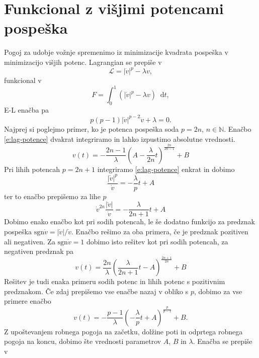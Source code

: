 \documentclass[a4paper, 12pt, slovene]{article}
\newcommand*\diff{\mathop{}\!\mathrm{d}}
\numberwithin{equation}{section}
\newcommand{\lag}{\mathcal{L}\!}
\begin{document}
\section{Funkcional z višjimi potencami pospeška}
Pogoj za udobje vožnje spremenimo iz minimizacije kvadrata pospeška v minimizacijo višjih potenc. Lagrangian se prepiše v 
\begin{equation}
\lag = |\dot{v}|^p - \lambda v,
\end{equation}
funkcional v
\begin{equation}
F = \int_0^1 (|\dot{v}|^p - \lambda v)\diff t,
\end{equation}
E-L enačba pa 
\begin{equation}
p(p-1) |\dot{v}|^{p-2}\ddot{v} + \lambda = 0.
\label{e:lag-potence}
\end{equation}
Najprej si poglejmo primer, ko je potenca pospeška soda $p = 2n$, $n \in \mathbb{N}$. Enačbo \eqref{e:lag-potence} dvakrat integriramo in lahko izpustimo absolutne vrednosti. 
\begin{equation}
v(t) = - \frac{2n-1}{\lambda} \left( A - \frac{\lambda}{2n} t \right)^{\frac{2n}{2n-1}} + B
\end{equation}
Pri lihih potencah $p=2n+1$ integriramo \eqref{e:lag-potence} enkrat in dobimo
\begin{equation}
\frac{|\dot{v}|^p}{\dot{v}}=-\frac{\lambda}{p}t + A
\end{equation}
ter to enačbo prepišemo za lihe $p$  
\begin{equation}
\dot{v}^{2n}\frac{|\dot{v}|}{\dot{v}}=-\frac{\lambda}{2n+1}t + A
\end{equation}
Dobimo enako enačbo kot pri sodih potencah, le še dodatno funkcijo za predznak pospeška $\mathrm{sgn} \dot{v} = |\dot{v}|/\dot{v}$. Enačbo rešimo za oba primera, če je predznak pozitiven ali negativen. Za $\mathrm{sgn} \dot{v} = 1$ dobimo isto rešitev kot pri sodih potencah, za negativen predznak pa
\begin{equation}
v(t) = \frac{2n}{\lambda} \left(\frac{\lambda}{2n+1} t - A\right)^{\frac{2n+1}{2n}} + B
\end{equation}
Rešitev je tudi enaka primeru sodih potenc in lihih potenc s pozitivnim predznakom. Če zdaj prepišemo vse enačbe nazaj v obliko s $p$, dobimo za vse primere enačbo
\begin{equation}
v(t) = -\frac{p-1}{\lambda} \left(-\frac{\lambda}{p}t + A \right)^{\frac{p}{p-1}} + B.
\label{e:hitrost-p}
\end{equation}
Z upoštevanjem robnega pogoja na začetku, dolžine poti in odprtega robnega pogoja na koncu, dobimo šte vrednosti parametrov $A$, $B$ in $\lambda$. Enačba se prepiše v
\end{document}
